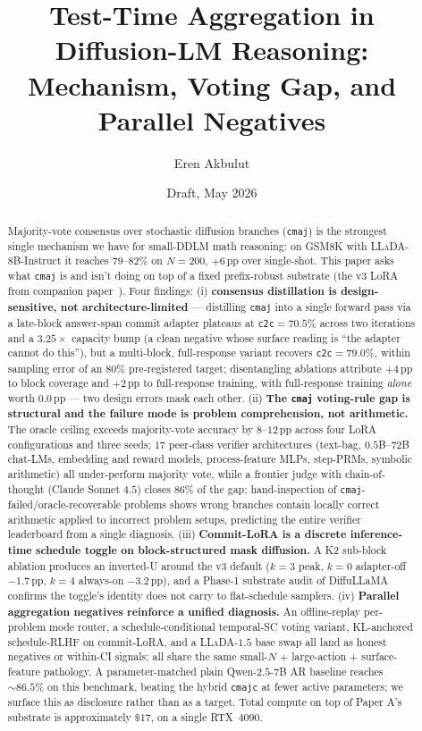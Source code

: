 \documentclass[11pt]{article}
\title{Test-Time Aggregation in Diffusion-LM Reasoning:\\
       Mechanism, Voting Gap, and Parallel Negatives}
\author{Eren Akbulut}
\date{Draft, May 2026}
\newcommand{\code}[1]{\texttt{#1}}
\newcommand{\LLaDA}{\textsc{LLaDA}}
\newcommand{\ctwoc}{\code{c2c}}
\newcommand{\cmaj}{\code{cmaj}}
\newcommand{\cmajc}{\code{cmajc}}
\begin{document}
\maketitle

\begin{abstract}
Majority-vote consensus over stochastic diffusion branches
(\cmaj{}) is the strongest single mechanism we have for small-DDLM
math reasoning: on GSM8K with \LLaDA{}-8B-Instruct it reaches
$79$--$82\%$ on $N{=}200$, $+6$\,pp over single-shot. This paper asks
what \cmaj{} is and isn't doing on top of a fixed prefix-robust
substrate (the v3 LoRA from companion paper~\cite{paperA}). Four
findings: (i) \textbf{consensus distillation is design-sensitive,
not architecture-limited} --- distilling \cmaj{} into a single
forward pass via a late-block answer-span commit adapter plateaus at
\ctwoc{}$=70.5\%$ across two iterations and a $3.25\times$ capacity
bump (a clean negative whose surface reading is ``the adapter
cannot do this''), but a multi-block, full-response variant recovers
\ctwoc{}$=79.0\%$, within sampling error of an $80\%$ pre-registered
target; disentangling ablations attribute $+4$\,pp to block coverage
and $+2$\,pp to full-response training, with full-response training
\emph{alone} worth $0.0$\,pp --- two design errors mask each other.
(ii) \textbf{The \cmaj{} voting-rule gap is structural and the
failure mode is problem comprehension, not arithmetic.}
The oracle ceiling exceeds majority-vote accuracy by $8$--$12$\,pp
across four LoRA configurations and three seeds; $17$ peer-class
verifier architectures (text-bag, $0.5$B--$72$B chat-LMs, embedding
and reward models, process-feature MLPs, step-PRMs, symbolic
arithmetic) all under-perform majority vote, while a frontier judge
with chain-of-thought (Claude Sonnet $4.5$) closes $86\%$ of the
gap; hand-inspection of \cmaj{}-failed/oracle-recoverable problems
shows wrong branches contain locally correct arithmetic applied to
incorrect problem setups, predicting the entire verifier
leaderboard from a single diagnosis.
(iii) \textbf{Commit-LoRA is a discrete inference-time schedule
toggle on block-structured mask diffusion.} A K2 sub-block ablation
produces an inverted-U around the v3 default ($k{=}3$ peak,
$k{=}0$ adapter-off $-1.7$\,pp, $k{=}4$ always-on $-3.2$\,pp), and
a Phase-1 substrate audit of DiffuLLaMA confirms the toggle's
identity does not carry to flat-schedule samplers.
(iv) \textbf{Parallel aggregation negatives reinforce a unified
diagnosis.} An offline-replay per-problem mode router, a
schedule-conditional temporal-SC voting variant, KL-anchored
schedule-RLHF on commit-LoRA, and a \LLaDA{}-$1.5$ base swap all
land as honest negatives or within-CI signals; all share the same
small-$N$ $+$ large-action $+$ surface-feature pathology.
A parameter-matched plain Qwen-$2.5$-$7$B AR baseline reaches
$\sim\!86.5\%$ on this benchmark, beating the hybrid \cmajc{} at
fewer active parameters; we surface this as disclosure rather than
as a target. Total compute on top of Paper A's substrate is
approximately $\$17$, on a single RTX~$4090$.
\end{abstract}
\end{document}
